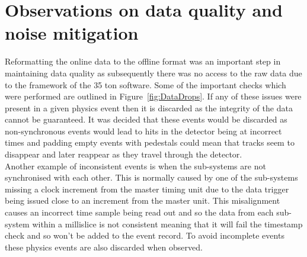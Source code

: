 \section{Observations on data quality and noise mitigation} \label{sec:AllTheNoise} %
Reformatting the online data to the offline format was an important step in maintaining data quality as subsequently there was no access to the raw data due to the framework of the 35 ton software. Some of the important checks which were performed are outlined in Figure~\ref{fig:DataDrops}. If any of these issues were present in a given physics event then it is discarded as the integrity of the data cannot be guaranteed. It was decided that these events would be discarded as non-synchronous events would lead to hits in the detector being at incorrect times and padding empty events with pedestals could mean that tracks seem to disappear and later reappear as they travel through the detector. \\

Another example of inconsistent events is when the sub-systems are not synchronised with each other. This is normally caused by one of the sub-systems missing a clock increment from the master timing unit due to the data trigger being issued close to an increment from the master unit. This misalignment causes an incorrect time sample being read out and so the data from each sub-system within a millislice is not consistent meaning that it will fail the timestamp check and so won't be added to the event record. To avoid incomplete events these physics events are also discarded when observed. \\


